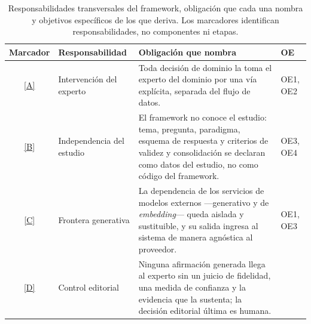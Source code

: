 \documentclass[12pt]{report}
\DeclareRobustCommand{\resp}[1]{\hyperref[tab:registro-responsabilidades]{\textcolor{respcolor}{[#1]}}}
\begin{document}
\begin{table}[H]
  \centering
  \caption{Responsabilidades transversales del framework, obligación que cada una nombra y objetivos específicos de los que deriva. Los marcadores identifican responsabilidades, no componentes ni etapas.}
  \label{tab:intro-responsabilidades}
  \footnotesize
  \setlength{\tabcolsep}{4pt}
  \begin{tabularx}{\textwidth}{@{}c >{\raggedright\arraybackslash}p{2.9cm} X l@{}}
    \toprule
    \textbf{Marcador} & \textbf{Responsabilidad}                                                                                                                                                                    & \textbf{Obligación que nombra} & \textbf{OE} \\
    \midrule
    \resp{A}          & Intervención del experto
                      & Toda decisión de dominio la toma el experto del dominio por una vía explícita, separada del flujo de datos.
                      & OE1, OE2                                                                                                                                                                                                                                   \\
    \addlinespace
    \resp{B}          & Independencia del estudio
                      & El framework no conoce el estudio: tema, pregunta, paradigma, esquema de respuesta y criterios de validez y consolidación se declaran como datos del estudio, no como código del framework.
                      & OE3, OE4                                                                                                                                                                                                                                   \\
    \addlinespace
    \resp{C}          & Frontera generativa
                      & La dependencia de los servicios de modelos externos ---generativo y de \textit{embedding}--- queda aislada y sustituible, y su salida ingresa al sistema de manera agnóstica al proveedor.
                      & OE1, OE3                                                                                                                                                                                                                                   \\
    \addlinespace
    \resp{D}          & Control editorial
                      & Ninguna afirmación generada llega al experto sin un juicio de fidelidad, una medida de confianza y la evidencia que la sustenta; la decisión editorial última es humana.

\end{tabularx}
\end{table}
\end{document}
